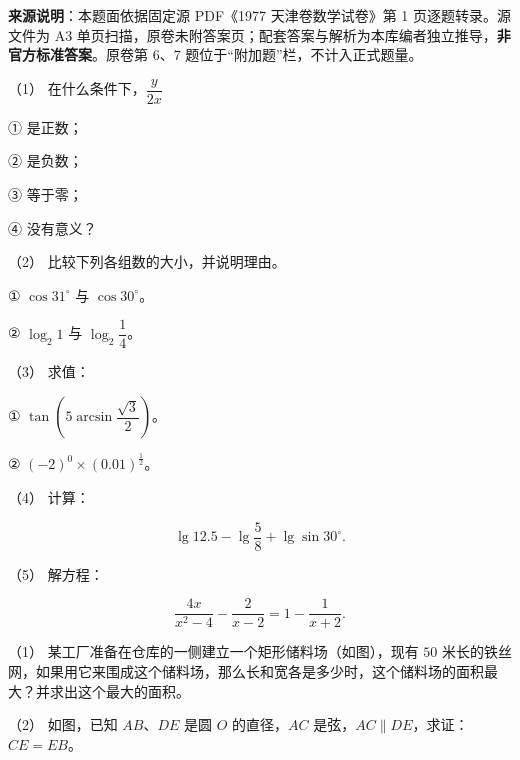 


\begin{gktip}
\textbf{来源说明}：本题面依据固定源 PDF《1977 天津卷数学试卷》第 1 页逐题转录。源文件为 A3 单页扫描，原卷未附答案页；配套答案与解析为本库编者独立推导，\textbf{非官方标准答案}。原卷第 6、7 题位于“附加题”栏，不计入正式题量。
\end{gktip}

\par\medskip

\begin{question}

（1） 在什么条件下，$\dfrac{y}{2x}$

① 是正数；

② 是负数；

③ 等于零；

④ 没有意义？

（2） 比较下列各组数的大小，并说明理由。

① $\cos31^\circ$ 与 $\cos30^\circ$。

② $\log_2 1$ 与 $\log_2\dfrac14$。

（3） 求值：

① $\tan\left(5\arcsin\dfrac{\sqrt3}{2}\right)$。

② $(-2)^0\times(0.01)^{\frac12}$。

（4） 计算：

\nopagebreak[4]
\[
\lg12.5-\lg\frac58+\lg\sin30^\circ.
\]

（5） 解方程：

\nopagebreak[4]
\[
\frac{4x}{x^2-4}-\frac2{x-2}=1-\frac1{x+2}.
\]

\Needspace{0.4\textheight}
\end{question}
\begin{question}

（1） 某工厂准备在仓库的一侧建立一个矩形储料场（如图），现有 $50$ 米长的铁丝网，如果用它来围成这个储料场，那么长和宽各是多少时，这个储料场的面积最大？并求出这个最大的面积。
\nopagebreak[4]
\begin{center}\end{center}
\nopagebreak[4]
（2） 如图，已知 $AB\text{、}DE$ 是圆 $O$ 的直径，$AC$ 是弦，$AC\parallel DE$，求证：$CE=EB$。
\nopagebreak[4]
\begin{center}\end{center}
\nopagebreak[4]
\end{question}
